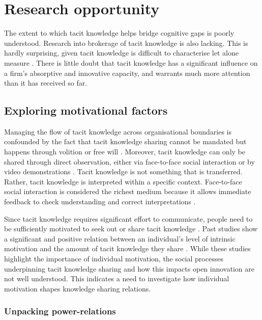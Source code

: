 \section{Research opportunity}

The extent to which tacit knowledge helps bridge cognitive gaps is poorly understood. Research into brokerage of tacit knowledge is also lacking. This is hardly surprising, given tacit knowledge is difficult to characterise let alone measure \citep{zander1995knowledge,cavusgil2003tacit}. There is little doubt that tacit knowledge has a significant influence on a firm's absorptive and innovative capacity, and warrants much more attention than it has received so far. \medskip

\subsection{Exploring motivational factors}

Managing the flow of tacit knowledge across organisational boundaries is confounded by the fact that tacit knowledge sharing cannot be mandated but happens through volition or free will \citep{polanyi1966tacit}. Moreover, tacit knowledge can only be shared through direct observation, either via face-to-face social interaction or by video demonstrations \citep{haldin2000difficulties,koskinen2003tacit}. Tacit knowledge is not something that is transferred. Rather, tacit knowledge is interpreted within a specific context. Face-to-face social interaction is considered the richest medium because it allows immediate feedback to check understanding and correct interpretations \citep{koskinen2003tacit}. \medskip

Since tacit knowledge requires significant effort to communicate, people need to be sufficiently motivated to seek out or share tacit knowledge \citep{leonard1998role}. Past studies show a significant and positive relation between an individual's level of intrinsic motivation and the amount of tacit knowledge they share \citep[e.g.][]{osterloh2000motivation,kaser2001knowledge,smith2001role}. While these studies highlight the importance of individual motivation, the social processes underpinning tacit knowledge sharing and how this impacts open innovation are not well understood. This indicates a need to investigate how individual motivation shapes knowledge sharing relations. \medskip

\subsubsection{Unpacking power-relations}

